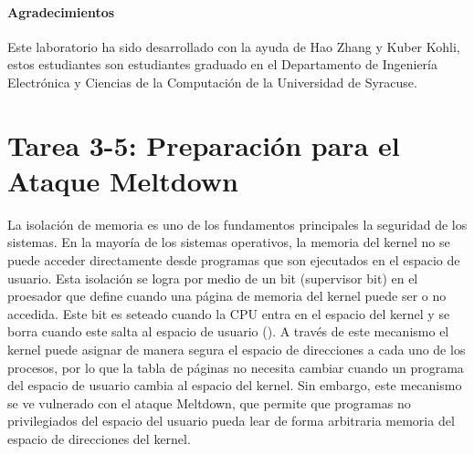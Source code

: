\paragraph{Agradecimientos} Este laboratorio ha sido desarrollado con la ayuda de 
Hao Zhang y Kuber Kohli, estos estudiantes son estudiantes graduado en el Departamento de Ingeniería Electrónica y Ciencias de la Computación de la Universidad de Syracuse.




\newcommand{\sideChannelFigs}{./Figs}





\section{Tarea 3-5: Preparación para el Ataque Meltdown}

La isolación de memoria es uno de los fundamentos principales la seguridad de los sistemas. En la mayoría de los sistemas operativos, la memoria del kernel no se puede acceder directamente desde programas que son ejecutados en el espacio de usuario. Esta isolación se logra por medio de un bit (supervisor bit) en el proesador que define cuando una página de memoria del kernel puede ser o no accedida. Este bit es seteado cuando la CPU entra en el espacio del kernel y se borra cuando este salta al espacio de usuario (\cite{wiki:protectionring}).
A través de este mecanismo el kernel puede asignar de manera segura el espacio de direcciones a cada uno de los procesos, por lo que la tabla de páginas no necesita cambiar cuando un programa del espacio de usuario cambia al espacio del kernel.
Sin embargo, este mecanismo se ve vulnerado con el ataque Meltdown, que permite que programas no privilegiados del espacio del usuario pueda lear de forma arbitraria memoria del espacio de direcciones del kernel.

